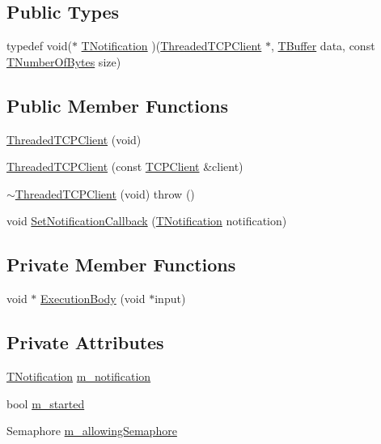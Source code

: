 \subsection*{Public Types}
\begin{DoxyCompactItemize}
\item 
typedef void($\ast$ \hyperlink{class_threaded_t_c_p_client_a67efb980455f9da4cdecd46eebbbb568}{T\-Notification} )(\hyperlink{class_threaded_t_c_p_client}{Threaded\-T\-C\-P\-Client} $\ast$, \hyperlink{class_socket_base_a1557d64029a25c20b4c306b80efcc143}{T\-Buffer} data, const \hyperlink{class_socket_base_ac414903631491453b96e71c06c2c2e72}{T\-Number\-Of\-Bytes} size)
\end{DoxyCompactItemize}
\subsection*{Public Member Functions}
\begin{DoxyCompactItemize}
\item 
\hyperlink{class_threaded_t_c_p_client_aee05df10793942b468883521a5bcc666}{Threaded\-T\-C\-P\-Client} (void)
\item 
\hyperlink{class_threaded_t_c_p_client_a79bb042d9ffb617c8da0dcef486d7a07}{Threaded\-T\-C\-P\-Client} (const \hyperlink{class_t_c_p_client}{T\-C\-P\-Client} \&client)
\item 
\hyperlink{class_threaded_t_c_p_client_a54cabf8982b04e30fa81189bbeeab5d8}{$\sim$\-Threaded\-T\-C\-P\-Client} (void)  throw ()
\item 
void \hyperlink{class_threaded_t_c_p_client_a46f301432b075ae8ce3928cb8635a546}{Set\-Notification\-Callback} (\hyperlink{class_threaded_t_c_p_client_a67efb980455f9da4cdecd46eebbbb568}{T\-Notification} notification)
\end{DoxyCompactItemize}
\subsection*{Private Member Functions}
\begin{DoxyCompactItemize}
\item 
void $\ast$ \hyperlink{class_threaded_t_c_p_client_a1cd1c985635fe8f87c444d3b78fcaefb}{Execution\-Body} (void $\ast$input)
\end{DoxyCompactItemize}
\subsection*{Private Attributes}
\begin{DoxyCompactItemize}
\item 
\hyperlink{class_threaded_t_c_p_client_a67efb980455f9da4cdecd46eebbbb568}{T\-Notification} \hyperlink{class_threaded_t_c_p_client_adc7409a7ec74e4ee527be24008cc2208}{m\-\_\-notification}
\item 
bool \hyperlink{class_threaded_t_c_p_client_a32d0d8b7239c8eda6ff9d4ab45de5e8e}{m\-\_\-started}
\item 
Semaphore \hyperlink{class_threaded_t_c_p_client_a54007f130f17856b944f0f35656ebc5c}{m\-\_\-allowing\-Semaphore}
\end{DoxyCompactItemize}
